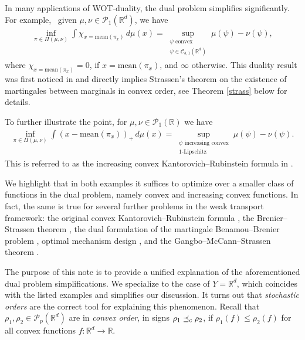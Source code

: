 \documentclass[reqno, a4paper]{amsart}
\newcommand{\lc}{\preceq_{\textnormal{c}}}
\newcommand{\PP}{\mathcal{P}}
\newcommand{\cP}{\mathcal{P}}
\newcommand{\Pc}{\cP}
\newcommand{\R}{\mathbb R}
\theoremstyle{definition}
\theoremstyle{definition}
\theoremstyle{definition}
\newcommand{\cpl}{\Pi}
\newcommand{\mean}{\mathrm{mean}}
\begin{document}
In many applications of WOT-duality, the dual problem simplifies significantly. For example, \ given $\mu, \nu\in \Pc_1(\R^d)$,  we have 
\begin{align}
    \inf_{\pi\in \cpl(\mu, \nu)} \int \chi_{x= \mean(\pi_x)} \, d\mu(x) = \sup_{ \substack{\psi \textrm{ convex} \\ \psi \in \mathcal C_{b,1}(\R^d)} } \mu(\psi)- \nu(\psi),
\end{align}
where $\chi_{x= \mean(\pi_x)}=0$, if $x= \mean(\pi_x)$, and $\infty$ otherwise. This duality result was first noticed in \cite{GoRoSaTe14} and directly implies Strassen's theorem on the existence of martingales between marginals in convex order, see Theorem \ref{strass} below for details.

To further illustrate the point, for $\mu, \nu \in \Pc_1(\R)$ we have 
\begin{align}
    \inf_{\pi\in \cpl(\mu, \nu)} \int (x-\mean(\pi_x))_+ \, d\mu(x) = \sup_{\substack{\psi \textrm{ increasing convex}\\ 1\textrm{-Lipschitz}}} \mu(\psi)- \nu(\psi).
\end{align}
This is referred to as the increasing convex Kantorovich--Rubinstein formula in \cite{BePaRiSc25}. 

We highlight that in both examples it suffices to optimize  over a smaller class of functions in the dual problem, namely convex and increasing convex functions. In fact, the same is true for several further problems in the weak transport framework: the original convex Kantorovich--Rubinstein formula \cite{GoRoSaTe14}, the Brenier--Strassen theorem \cite{GoJu18}, the dual formulation of the martingale Benamou--Brenier problem \cite{backhoffveraguas2025existencebassmartingalesmartingale}, optimal mechanism design \cite{DaDeTz17}, and the Gangbo--McCann--Strassen theorem \cite{BePaRiSc25}. 

The purpose of this note is to provide a unified explanation of the aforementioned dual problem simplifications. We specialize to the case of $Y=\R^d$, which coincides with the listed examples and simplifies our discussion. It turns out that \textit{stochastic orders} are the correct tool for explaining this phenomenon. Recall that $\rho_1, \rho_2 \in\PP_p(\R^d)$ are in  \textit{convex order}, in signs $\rho_1\lc \rho_2$, if $\rho_1(f) \leq \rho_2(f)$ for all convex functions $f:\R^d\to\R$. 
\end{document}
